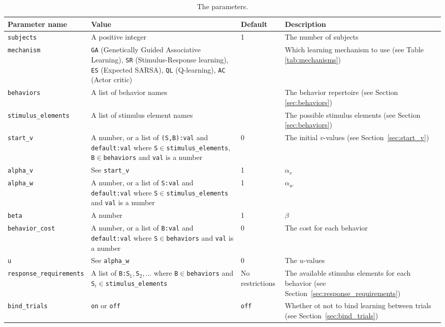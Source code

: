 \documentclass[11pt]{article}
\newcommand{\scr}[1]{\lstinline|#1|}
\begin{document}
\begin{table}[h]
\scriptsize
\begin{tabular}[t]{|L{3cm}|L{4cm}|L{1.2cm}|L{2.9cm}|}
	\hline
	\textbf{Parameter name} & \textbf{Value} & \textbf{Default} & \textbf{Description} \\
	\hline
	\verb|subjects|           & A positive integer & 1 & The number of subjects \\ \hline
	\verb|mechanism|         & \verb|GA| (Genetically Guided Associative Learning), \newline \verb|SR| (Stimulus-Response learning), \newline \verb|ES| (Expected SARSA), \newline \verb|QL| (Q-learning), \newline \verb|AC| (Actor critic) & & Which learning mechanism to use (see Table \ref{tab:mechanisms}) \\ \hline
	\verb|behaviors|         & A list of behavior names & & The behavior repertoire (see Section \ref{sec:behaviors}) \\ \hline
	\verb|stimulus_elements| & A list of stimulus element names & & The possible stimulus elements (see Section \ref{sec:behaviors}) \\ \hline
	\verb|start_v|           & A number, or a list of \scr{(S,B):val} and \scr{default:val} where \scr{S}$\in$\verb|stimulus_elements|, \scr{B}$\in$\verb|behaviors| and \scr{val} is a number & 0 & The initial $v$-values (see Section~\ref{sec:start_v})\\ \hline
	\verb|alpha_v|           & See \scr{start_v} & 1 & $\alpha_v$ \\ \hline
	\verb|alpha_w|           & A number, or a list of \scr{S:val} and \scr{default:val} where \scr{S}$\in$\verb|stimulus_elements| and \scr{val} is a number & 1 & $\alpha_w$ \\ \hline
	\verb|beta|              & A number & 1 & $\beta$ \\ \hline
	\verb|behavior_cost|     & A number, or a list of \scr{B:val} and \scr{default:val} where \scr{S}$\in$\verb|behaviors| and \scr{val} is a number & 0 & The cost for each behavior \\ \hline
	\verb|u|                 & See \scr{alpha_w} & 0 & The $u$-values \\ \hline
	\verb|response_requirements| & A list of \scr{B:S}$_1,$\scr{S}$_2,\dotsc$ where \scr{B}$\in$\verb|behaviors| and \scr{S}$_i\in$\verb|stimulus_elements| & No restrictions & The available stimulus elements for each behavior (see Section~\ref{sec:response_requirements}) \\ \hline
	\verb|bind_trials|         & \scr{on} or \scr{off} & \scr{off} & Whether ot not to bind learning between trials (see Section~\ref{sec:bind_trials}) \\
	\hline
\end{tabular}
\caption{The parameters. \label{tab:parameters}}
\end{table}
\end{document}
